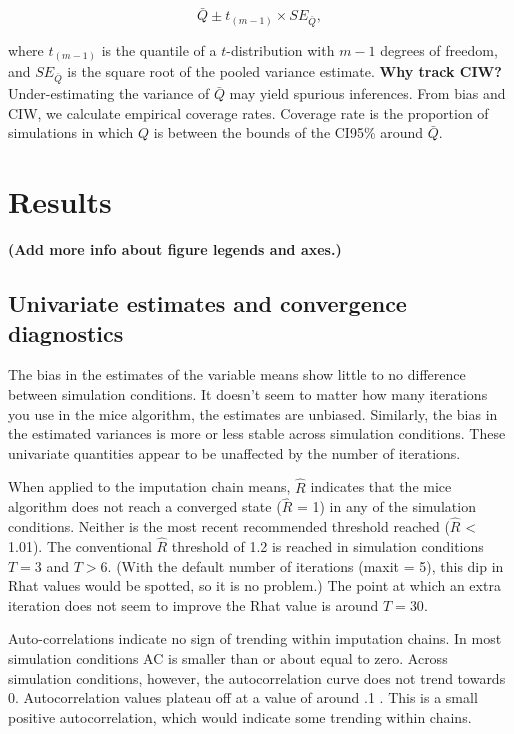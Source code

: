 \documentclass[Royal,times,sageh]{sagej}
\begin{document}
\[\bar{Q} \pm t_{(m-1)} \times SE_{\bar{Q}},\]

where \(t_{(m-1)}\) is the quantile of a \(t\)-distribution with \(m-1\)
degrees of freedom, and \(SE_{\bar{Q}}\) is the square root of the
pooled variance estimate. \textbf{Why track CIW?} Under-estimating the
variance of \(\bar{Q}\) may yield spurious inferences. From bias and
CIW, we calculate empirical coverage rates. Coverage rate is the
proportion of simulations in which \(Q\) is between the bounds of the
CI95\% around \(\bar{Q}\).

\hypertarget{results}{%
\section{Results}\label{results}}

\textbf{(Add more info about figure legends and axes.)}

\hypertarget{univariate-estimates-and-convergence-diagnostics}{%
\subsection{Univariate estimates and convergence
diagnostics}\label{univariate-estimates-and-convergence-diagnostics}}

The bias in the estimates of the variable means show little to no
difference between simulation conditions. It doesn't seem to matter how
many iterations you use in the mice algorithm, the estimates are
unbiased. Similarly, the bias in the estimated variances is more or less
stable across simulation conditions. These univariate quantities appear
to be unaffected by the number of iterations.

When applied to the imputation chain means, \(\widehat{R}\) indicates
that the mice algorithm does not reach a converged state
(\(\widehat{R}\) = 1) in any of the simulation conditions. Neither is
the most recent recommended threshold reached (\(\widehat{R}\)
\textless{} 1.01). The conventional \(\widehat{R}\) threshold of 1.2 is
reached in simulation conditions \(T = 3\) and \(T > 6\). (With the
default number of iterations (maxit = 5), this dip in Rhat values would
be spotted, so it is no problem.) The point at which an extra iteration
does not seem to improve the Rhat value is around \(T=30\).

Auto-correlations indicate no sign of trending within imputation chains.
In most simulation conditions AC is smaller than or about equal to zero.
Across simulation conditions, however, the autocorrelation curve does
not trend towards 0. Autocorrelation values plateau off at a value of
around .1 . This is a small positive autocorrelation, which would
indicate some trending within chains.
\end{document}
